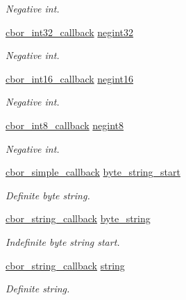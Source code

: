 \begin{DoxyCompactItemize}
\begin{DoxyCompactList}\small\item\em Negative int. \end{DoxyCompactList}\item 
\hyperlink{callbacks_8h_a3c9d3bfd7f55faa430ba58ce9ebf9cfe}{cbor\-\_\-int32\-\_\-callback} \hyperlink{structcbor__callbacks_a26e8c4f53af47eaaf8928b86fb92a44f}{negint32}
\begin{DoxyCompactList}\small\item\em Negative int. \end{DoxyCompactList}\item 
\hyperlink{callbacks_8h_a663bfb4b82d31d5eeeffc6db48b487c6}{cbor\-\_\-int16\-\_\-callback} \hyperlink{structcbor__callbacks_a0e47df73a7ecf894ab75e04a1cc83dc7}{negint16}
\begin{DoxyCompactList}\small\item\em Negative int. \end{DoxyCompactList}\item 
\hyperlink{callbacks_8h_a2b9b84ad36e0fc4d1498413d8497899e}{cbor\-\_\-int8\-\_\-callback} \hyperlink{structcbor__callbacks_aae703108db340c2df1af0154b23b9631}{negint8}
\begin{DoxyCompactList}\small\item\em Negative int. \end{DoxyCompactList}\item 
\hyperlink{callbacks_8h_a414becb6eeb6a2c4fcb4d657b17d3113}{cbor\-\_\-simple\-\_\-callback} \hyperlink{structcbor__callbacks_adf65a04d2423dcdd73cec4a261ccb6aa}{byte\-\_\-string\-\_\-start}
\begin{DoxyCompactList}\small\item\em Definite byte string. \end{DoxyCompactList}\item 
\hyperlink{callbacks_8h_a39ac73691a2cbc95aac02b088851ff88}{cbor\-\_\-string\-\_\-callback} \hyperlink{structcbor__callbacks_a0c2528e2b1d6df97053168d24e53e278}{byte\-\_\-string}
\begin{DoxyCompactList}\small\item\em Indefinite byte string start. \end{DoxyCompactList}\item 
\hyperlink{callbacks_8h_a39ac73691a2cbc95aac02b088851ff88}{cbor\-\_\-string\-\_\-callback} \hyperlink{structcbor__callbacks_a18144e8cc29b3562f071188c3d9086eb}{string}
\begin{DoxyCompactList}\small\item\em Definite string. \end{DoxyCompactList}\item 

\end{DoxyCompactItemize}
